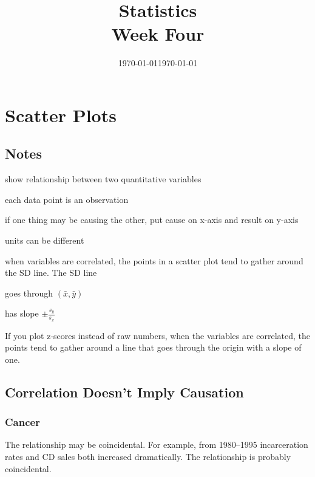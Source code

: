 \documentclass[landscape]{exam}
\author{}
\date{\today}
\title{Statistics \\ Week Four}
\date{\today}
\author{}
\begin{document}
\maketitle
\tableofcontents

  \section{Scatter Plots}

  \subsection{Notes}
  \begin{itemize*}
    \item show relationship between two quantitative variables
    \item each data point is an observation
    \item if one thing may be causing the other, put cause on x-axis and
      result on y-axis
    \item units can be different
    \item when variables are correlated, the points in a scatter plot tend to
      gather around the SD line.  The SD line 
      \begin{itemize*}
        \item goes through $(\bar{x}, \bar{y})$
        \item has slope $\pm \frac{s_y}{s_x}$
      \end{itemize*}

    \item If you plot z-scores instead of raw numbers, when the variables are
      correlated, the points tend to gather around a line that goes through the
      origin with a slope of one.

  \end{itemize*}

  \subsection{Correlation Doesn't Imply Causation}  

  \subsubsection{Cancer} %
  
  The relationship may be coincidental.  For example, from 1980--1995
  incarceration rates and CD sales both increased dramatically.  The
  relationship is probably coincidental.  
\end{document}

